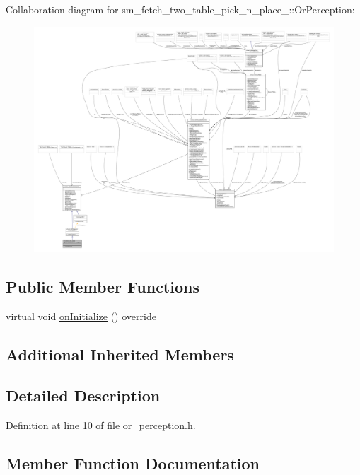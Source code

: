 Collaboration diagram for sm\+\_\+fetch\+\_\+two\+\_\+table\+\_\+pick\+\_\+n\+\_\+place\+\_\+:\+:Or\+Perception\+:
\nopagebreak
\begin{figure}[H]
\begin{center}
\leavevmode
\includegraphics[width=350pt]{classsm__fetch__two__table__pick__n__place__1_1_1OrPerception__coll__graph}
\end{center}
\end{figure}
\subsection*{Public Member Functions}
\begin{DoxyCompactItemize}
\item 
virtual void \hyperlink{classsm__fetch__two__table__pick__n__place__1_1_1OrPerception_a9205e355033bafe9b4be2d937cb46783}{on\+Initialize} () override
\end{DoxyCompactItemize}
\subsection*{Additional Inherited Members}


\subsection{Detailed Description}


Definition at line 10 of file or\+\_\+perception.\+h.



\subsection{Member Function Documentation}
\mbox{\label{classsm__fetch__two__table__pick__n__place__1_1_1OrPerception_a9205e355033bafe9b4be2d937cb46783}} 
